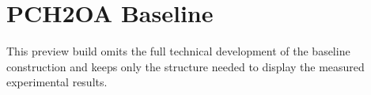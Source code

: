 \section{PCH2OA Baseline}
This preview build omits the full technical development of the baseline construction and keeps only the structure needed to display the measured experimental results.
